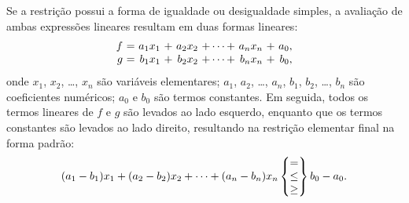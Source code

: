 \documentclass[11pt, brazil]{report}
\begin{document}
%
%
%
%


Se a restrição possui a forma de igualdade ou desigualdade simples,
a avaliação de ambas \linebreak expressões lineares resultam em duas formas lineares:
$$\begin{array}{r@{\ }c@{\ }r@{\ }c@{\ }r@{\ }c@{\ }r@{\ }c@{\ }r}
f&=&a_1x_1&+&a_2x_2&+\dots+&a_nx_n&+&a_0,\\
g&=&b_1x_1&+&b_2x_2&+\dots+&b_nx_n&+&b_0,\\
\end{array}$$
onde $x_1$, $x_2$, \dots, $x_n$ são variáveis elementares; $a_1$, $a_2$,
\dots, $a_n$, $b_1$, $b_2$, \dots, $b_n$ são coeficientes numéricos;
$a_0$ e $b_0$ são termos constantes. Em seguida, todos os termos lineares
de $f$ e $g$ são levados ao lado esquerdo, enquanto que os termos constantes
são levados ao lado direito, resultando na restrição elementar
final na forma padrão:
$$(a_1-b_1)x_1+(a_2-b_2)x_2+\dots+(a_n-b_n)x_n\left\{
\begin{array}{@{}c@{}}=\\\leq\\\geq\\\end{array}\right\}b_0-a_0.$$
\end{document}
